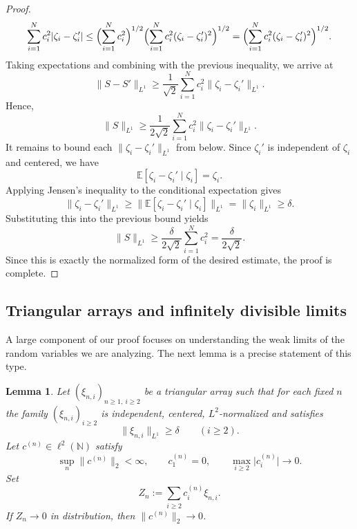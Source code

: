\documentclass[11pt]{amsart}
\numberwithin{equation}{section}
\newtheorem{lemma}[theorem]{Lemma}
\theoremstyle{definition}
\theoremstyle{remark}
\newcommand{\E}{\mathbb E}
\newcommand{\N}{\mathbb N}
\newcommand{\abs}[1]{\lvert #1 \rvert}
\newcommand{\norm}[1]{\lVert #1 \rVert}
\begin{document}
\begin{proof}
\[\sum_{i=1}^N c_i^2\abs{\zeta_i-\zeta_i'}
\le
\Bigl(\sum_{i=1}^N c_i^2\Bigr)^{1/2}
\Bigl(\sum_{i=1}^N c_i^2(\zeta_i-\zeta_i')^2\Bigr)^{1/2}
=
\Bigl(\sum_{i=1}^N c_i^2(\zeta_i-\zeta_i')^2\Bigr)^{1/2}.
\]
Taking expectations and combining with the previous inequality, we arrive at
\[
\norm{S-S'}_{L^1}
\ge
\frac{1}{\sqrt2}\sum_{i=1}^N c_i^2\norm{\zeta_i-\zeta_i'}_{L^1}.
\]
Hence,
\[
\norm{S}_{L^1}
\ge
\frac{1}{2\sqrt2}\sum_{i=1}^N c_i^2\norm{\zeta_i-\zeta_i'}_{L^1}.
\]
It remains to bound each $\norm{\zeta_i-\zeta_i'}_{L^1}$ from below.  Since
$\zeta_i'$ is independent of $\zeta_i$ and centered, we have
\[
\E[\zeta_i-\zeta_i' \mid \zeta_i]
=\zeta_i.
\]
Applying Jensen's inequality to the conditional expectation gives
\[
\norm{\zeta_i-\zeta_i'}_{L^1}
\ge
\norm{\E[\zeta_i-\zeta_i' \mid \zeta_i]}_{L^1}
=\norm{\zeta_i}_{L^1}
\ge \delta.
\]
Substituting this into the previous bound yields
\[
\norm{S}_{L^1}
\ge
\frac{\delta}{2\sqrt2}\sum_{i=1}^N c_i^2
=\frac{\delta}{2\sqrt2}.
\]
Since this is exactly the normalized form of the desired estimate, the proof is
complete.
\end{proof}

\subsection{Triangular arrays and infinitely divisible limits}
A large component of our proof focuses on understanding the weak limits of the random variables we are analyzing. The next lemma is a precise statement of this type.

\begin{lemma}\label{lem:tail-rigidity}
Let $(\xi_{n,i})_{n\ge1,\ i\ge2}$ be a triangular array such that for each
fixed $n$ the family $(\xi_{n,i})_{i\ge2}$ is independent, centered,
$L^2$-normalized and satisfies
\[
\norm{\xi_{n,i}}_{L^1}\ge \delta
\qquad(i\ge2).
\]
Let $c^{(n)}\in \ell^2(\N)$ satisfy
\[
\sup_n \norm{c^{(n)}}_2<\infty,
\qquad
c_1^{(n)}=0,
\qquad
\max_{i\ge2}\abs{c_i^{(n)}}\to0.
\]
Set
\[
Z_n:=\sum_{i\ge2} c_i^{(n)}\xi_{n,i}.
\]
If $Z_n\to0$ in distribution, then $\norm{c^{(n)}}_2\to0$.
\end{lemma}
\end{document}
